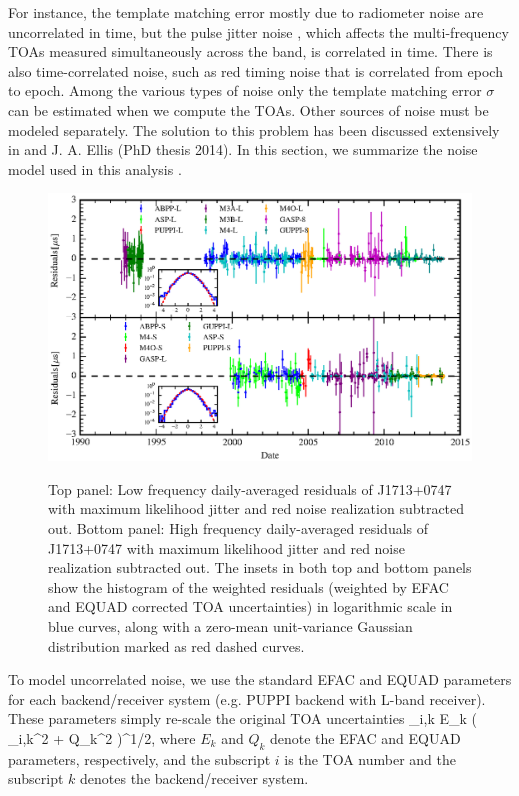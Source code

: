 For instance, the template matching error mostly due to radiometer noise are
uncorrelated in time, but the pulse jitter noise \citep{cs10}, which affects
the multi-frequency TOAs measured simultaneously across the band, is correlated in time.
There is also time-correlated noise, such as red timing noise that is
correlated from epoch to epoch. Among the various types of noise only the
template matching error $\sigma$ can be estimated when we compute the TOAs.
Other sources of noise must be modeled separately. The solution to this problem has been discussed extensively in \citet{vl13, ell13, vhv14a, vhv14, abb+14} and J. A. Ellis (PhD thesis 2014). In this section, we summarize the noise model used in this analysis \citep[see e.g.][for more details]{abb+15b}.



\begin{figure}[!ht]
\centering
\includegraphics[scale=1.0]{fig4.eps} \\ 
\caption{\label{fig:detres} Top panel: Low frequency daily-averaged residuals of J1713+0747 with maximum likelihood
jitter and red noise realization subtracted out. Bottom panel: High frequency
daily-averaged residuals of J1713+0747 with maximum likelihood jitter and red
noise realization subtracted out. The insets in both top and bottom panels
show the histogram of the weighted residuals (weighted by EFAC and EQUAD
corrected TOA uncertainties) in logarithmic scale in blue curves, along with a
zero-mean unit-variance Gaussian distribution marked as red dashed curves.}
\end{figure} 

To model uncorrelated noise, we use the standard EFAC and EQUAD parameters for each
backend/receiver system (e.g. PUPPI backend with L-band receiver). These parameters
simply re-scale the original TOA uncertainties
\be
\sigma_{i,k} \rightarrow  E_{k} \left( \sigma_{i,k}^{2} + Q_{k}^{2}  \right)^{1/2},
\ee
where $E_{k}$ and $Q_{k}$ denote the EFAC and EQUAD parameters, respectively, and the subscript
$i$ is the TOA number and the subscript $k$ denotes the backend/receiver system.

